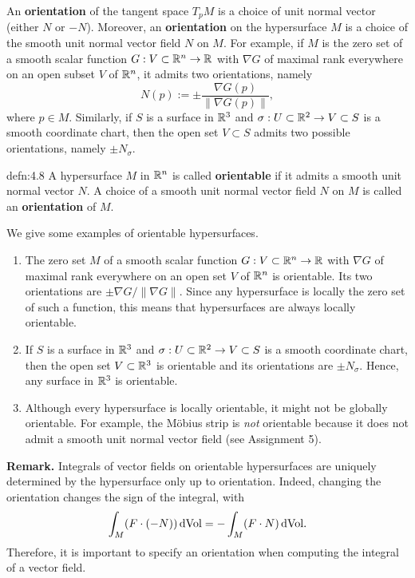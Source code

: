 An {\bf orientation} of the tangent space $T_pM$ is a choice of unit 
normal vector (either $N$ or $-N$). Moreover, an {\bf orientation} on the 
hypersurface $M$ is a choice of the smooth unit normal vector field $N$ on $M$. 
For example, if $M$ is the zero set of a smooth scalar function $G : 
V \subset \mathbb{R}^n \to \mathbb{R}$ with $\nabla G$ of maximal rank everywhere on an open 
subset $V$ of $\mathbb{R}^n$, it admits two orientations, namely 
\[ N(p) := \pm \frac{\nabla G(p)}{\|\nabla G(p)\|}, \] 
where $p \in M$. Similarly, if $S$ is a surface in $\mathbb{R}^3$ and $\sigma : 
U \subset \mathbb{R}^2 \to V \subset S$ is a smooth coordinate chart, then the 
open set $V \subset S$ admits two possible orientations, namely $\pm N_\sigma$. 

\begin{defn}{defn:4.8}
    A hypersurface $M$ in $\mathbb{R}^n$ is called {\bf orientable} if it admits a 
    smooth unit normal vector $N$. A choice of a smooth unit normal vector 
    field $N$ on $M$ is called an {\bf orientation} of $M$. 
\end{defn}\vspace{-0.25cm}

We give some examples of orientable hypersurfaces. 
\begin{enumerate}[(1)]
    \item The zero set $M$ of a smooth scalar function $G : V \subset \mathbb{R}^n 
    \to \mathbb{R}$ with $\nabla G$ of maximal rank everywhere on an open 
    set $V$ of $\mathbb{R}^n$ is orientable. Its two orientations are 
    $\pm\nabla G/\|\nabla G\|$. Since any hypersurface is locally 
    the zero set of such a function, this means that hypersurfaces 
    are always locally orientable. 

    \item If $S$ is a surface in $\mathbb{R}^3$ and $\sigma : U \subset \mathbb{R}^2 \to V \subset S$ 
    is a smooth coordinate chart, then the open set $V \subset \mathbb{R}^3$ is 
    orientable and its orientations are $\pm N_\sigma$. Hence, any 
    surface in $\mathbb{R}^3$ is orientable. 

    \item Although every hypersurface is locally orientable, it might not be 
    globally orientable. For example, the M\"obius strip is \emph{not} 
    orientable because it does not admit a smooth unit normal vector field 
    (see Assignment 5).
\end{enumerate}

{\bf Remark.} Integrals of vector fields on orientable hypersurfaces 
are uniquely determined by the hypersurface only up to orientation. 
Indeed, changing the orientation changes the sign of the integral, with 
\[ \int_M (F \cdot (-N))\operatorname{dVol} = -\int_M (F \cdot N)\operatorname{dVol}\!. \] 
Therefore, it is important to specify an orientation when computing the 
integral of a vector field. 

